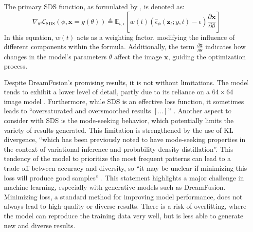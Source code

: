 The primary SDS function, as formulated by \citeauthor{pooleDreamfusion}, is denoted as:~\[
\nabla_{\theta}\mathcal{L}_{\text{SDS}}(\phi,\mathbf{x}=g(\theta))\triangleq\mathbb{E}_{t,\epsilon}\left[w(t)\left(\hat{\epsilon}_{\phi}({\mathbf{z}}_{t};y,t)-\epsilon\right){\frac{\partial\mathbf{x}}{\partial\theta}}\right]
\] In this equation, \( w(t) \) acts as a weighting factor, modifying the influence of different components within the formula. Additionally, the term \( \frac{\partial\mathbf{x}}{\partial\theta} \) indicates how changes in the model's parameters \( \theta \) affect the image \( \mathbf{x} \), guiding the optimization process.

Despite DreamFusion's promising results, it is not without limitations. The model tends to exhibit a lower level of detail, partly due to its reliance on a \( 64 \times 64 \) image model \citep{lin2023magic3d}. Furthermore, while SDS is an effective loss function, it sometimes leads to ``oversaturated and oversmoothed results \([\ldots]\)'' \citep{pooleDreamfusion}. Another aspect to consider with SDS is the mode-seeking behavior, which potentially limits the variety of results generated. This limitation is strengthened by the use of KL divergence, ``which has been previously noted to have mode-seeking properties in the context of variational inference and probability density distillation''\citep{pooleDreamfusion}. This tendency of the model to prioritize the most frequent patterns can lead to a trade-off between accuracy and diversity, so ``it may be unclear if minimizing this loss will produce good samples'' \citep{pooleDreamfusion}. This statement highlights a major challenge in machine learning, especially with generative models such as DreamFusion. Minimizing loss, a standard method for improving model performance, does not always lead to high-quality or diverse results. There is a risk of overfitting, where the model can reproduce the training data very well, but is less able to generate new and diverse results.